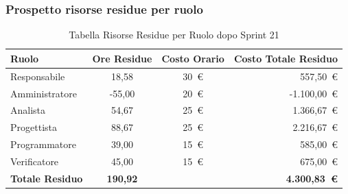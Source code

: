\subsubsection{Prospetto risorse residue per ruolo}
\begin{table}[H]
    \centering
    \renewcommand{\arraystretch}{1.3}
    \begin{tabularx}{\textwidth}{|X|c|c|r|}
        \hline
        \textbf{Ruolo} & \textbf{Ore Residue} & \textbf{Costo Orario} &
        \textbf{Costo Totale Residuo} \\
        \hline
        Responsabile   & 18,58 & 30~\euro & 557{,}50~\euro \\
        Amministratore & {-55,00} & 20~\euro & {-1.100{,}00~\euro} \\
        Analista       & 54,67 & 25~\euro & 1.366{,}67~\euro \\
        Progettista    & 88,67 & 25~\euro & 2.216{,}67~\euro \\
        Programmatore  & 39,00 & 15~\euro & 585{,}00~\euro \\
        Verificatore   & 45,00 & 15~\euro & 675{,}00~\euro \\
        \hline
        \textbf{Totale Residuo} & \textbf{190,92} & &
        \textbf{4.300{,}83~\euro} \\
        \hline
    \end{tabularx}
    \caption{Tabella Risorse Residue per Ruolo dopo Sprint 21}
\end{table}


